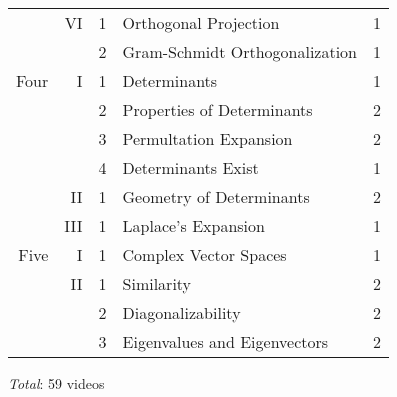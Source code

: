 \documentclass{article}
\begin{document}
\begin{center}
\begin{tabular}{|rrc|ll|}
      \cline{4-5}
      &VI  &1 &Orthogonal Projection              &1   \\
      &    &2 &Gram-Schmidt Orthogonalization     &1   \\
  \hline
 Four &I   &1 &Determinants                       &1   \\
      &    &2 &Properties of Determinants         &2   \\
      &    &3 &Permultation Expansion             &2   \\
      &    &4 &Determinants Exist                 &1   \\
      \cline{4-5}
      &II  &1 &Geometry of Determinants           &2   \\
      \cline{4-5}
      &III &1 &Laplace's Expansion                &1   \\
 \hline
 Five &I   &1 &Complex Vector Spaces              &1   \\
      \cline{4-5}
      &II  &1 &Similarity                         &2   \\
      &    &2 &Diagonalizability                  &2   \\
      &    &3 &Eigenvalues and Eigenvectors       &2   \\
 \hline
\end{tabular}
\end{center}
\vspace{1ex}
\textit{Total}: 59 videos
\end{document}
